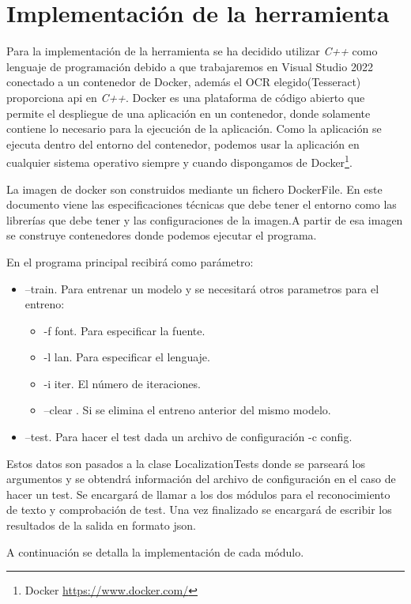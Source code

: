 \chapter{Implementación de la herramienta}
\label{cap:implementacion}

Para la implementación de la herramienta se ha decidido utilizar \emph{C++} como lenguaje de programación debido a que trabajaremos en Visual Studio 2022 conectado a un contenedor de Docker, además el OCR elegido(Tesseract) proporciona api en \emph{C++}. Docker es una plataforma de código abierto que permite el despliegue de una aplicación en un contenedor, donde solamente contiene lo necesario para la ejecución de la aplicación. Como la aplicación se ejecuta dentro del entorno del contenedor, podemos usar la aplicación en cualquier sistema operativo siempre y cuando dispongamos de Docker\footnote{Docker \url{https://www.docker.com/}}.

La imagen de docker son construidos mediante un fichero 
DockerFile. En este documento viene las especificaciones técnicas que debe tener el entorno como las librerías que debe tener y las configuraciones de la imagen.A partir de esa imagen se construye contenedores donde podemos ejecutar el programa.

En el programa principal recibirá como parámetro:
\begin{itemize}
	\item --train. Para entrenar un modelo y se necesitará otros parametros para el entreno:
	\begin{itemize}
		\item -f font. Para especificar la fuente.
		\item -l lan. Para especificar el lenguaje.
		\item -i iter. El número de iteraciones.
		\item --clear . Si se elimina el entreno anterior del mismo modelo.
	\end{itemize}
	\item --test. Para hacer el test dada un archivo de configuración -c config.
\end{itemize}
Estos datos son pasados a la clase LocalizationTests donde se parseará los argumentos y se obtendrá información del archivo de configuración en el caso de hacer un test. Se encargará de llamar a los dos módulos para el reconocimiento de texto y comprobación de test. Una vez finalizado se encargará de escribir los resultados de la salida en formato json.

A continuación se detalla la implementación de cada módulo.
